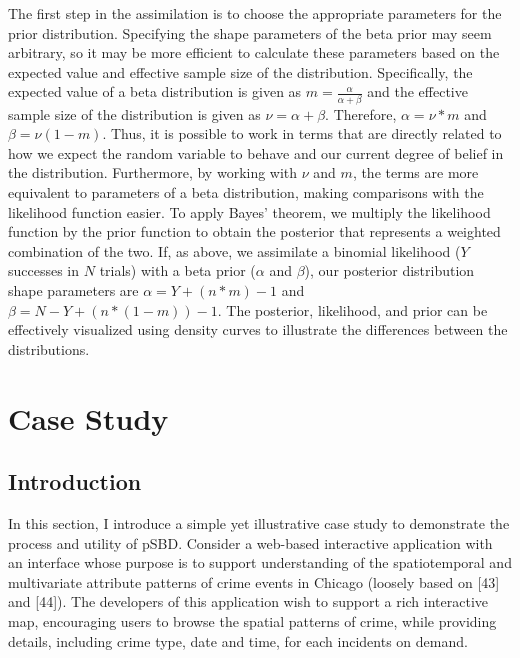 \documentclass[]{article}
\begin{document}
The first step in the assimilation is to choose the appropriate
parameters for the prior distribution. Specifying the shape parameters
of the beta prior may seem arbitrary, so it may be more efficient to
calculate these parameters based on the expected value and effective
sample size of the distribution. Specifically, the expected value of a
beta distribution is given as \(m = \frac{\alpha}{\alpha + \beta}\) and
the effective sample size of the distribution is given as
\(\nu = \alpha + \beta\). Therefore, \(\alpha = \nu * m\) and
\(\beta = \nu(1 - m)\). Thus, it is possible to work in terms that are
directly related to how we expect the random variable to behave and our
current degree of belief in the distribution. Furthermore, by working
with \(\nu\) and \(m\), the terms are more equivalent to parameters of a
beta distribution, making comparisons with the likelihood function
easier. To apply Bayes' theorem, we multiply the likelihood function by
the prior function to obtain the posterior that represents a weighted
combination of the two. If, as above, we assimilate a binomial
likelihood (\(Y\) successes in \(N\) trials) with a beta prior
(\(\alpha\) and \(\beta\)), our posterior distribution shape parameters
are \(\alpha = Y + (n*m) - 1\) and \(\beta= N - Y + (n*(1-m)) - 1\). The
posterior, likelihood, and prior can be effectively visualized using
density curves to illustrate the differences between the
distributions.\textbar{}

\section{Case Study}\label{case-study}

\subsection{Introduction}\label{introduction-1}

In this section, I introduce a simple yet illustrative case study to
demonstrate the process and utility of pSBD. Consider a web-based
interactive application with an interface whose purpose is to support
understanding of the spatiotemporal and multivariate attribute patterns
of crime events in Chicago (loosely based on {[}43{]} and {[}44{]}). The
developers of this application wish to support a rich interactive map,
encouraging users to browse the spatial patterns of crime, while
providing details, including crime type, date and time, for each
incidents on demand.
\end{document}
